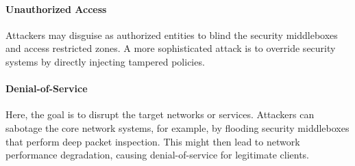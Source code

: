 
\paragraph{Unauthorized Access}
Attackers may disguise as authorized entities to blind the security middleboxes and
access restricted zones.
A more sophisticated attack is to override security systems by directly injecting
tampered policies.

\paragraph{Denial-of-Service}
Here, the goal is to disrupt the target networks or services. Attackers can sabotage the core network
systems, for example, by flooding security middleboxes that perform deep packet inspection.
This might then lead to network performance degradation, causing
denial-of-service for legitimate clients.


